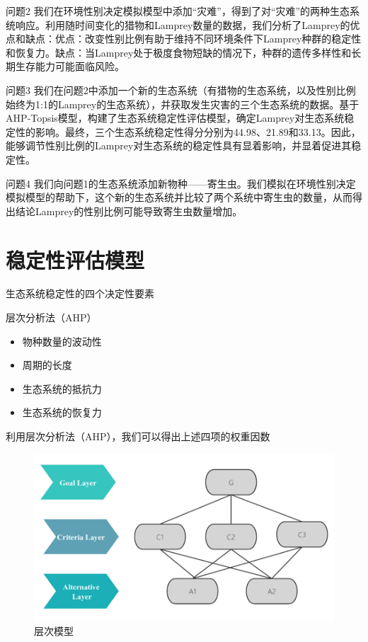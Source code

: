 \documentclass{beamer}
\begin{document}
\begin{frame}{问题2}
    \hspace{2em} 我们在环境性别决定模拟模型中添加“灾难”，得到了对“灾难”的两种生态系统响应。利用随时间变化的猎物和Lamprey数量的数据，我们分析了Lamprey的优点和缺点：优点：改变性别比例有助于维持不同环境条件下Lamprey种群的稳定性和恢复力。缺点：当Lamprey处于极度食物短缺的情况下，种群的遗传多样性和长期生存能力可能面临风险。
\end{frame}

\begin{frame}{问题3}
    \hspace{2em} 我们在问题2中添加一个新的生态系统（有猎物的生态系统，以及性别比例始终为1:1的Lamprey的生态系统），并获取发生灾害的三个生态系统的数据。基于AHP‑Topsis模型，构建了生态系统稳定性评估模型，确定Lamprey对生态系统稳定性的影响。最终，三个生态系统稳定性得分分别为44.98、21.89和33.13。因此，能够调节性别比例的Lamprey对生态系统的稳定性具有显着影响，并显着促进其稳定性。
\end{frame}

\begin{frame}{问题4}
    \hspace{2em} 我们向问题1的生态系统添加新物种——寄生虫。我们模拟在环境性别决定模拟模型的帮助下，这个新的生态系统并比较了两个系统中寄生虫的数量，从而得出结论Lamprey的性别比例可能导致寄生虫数量增加。
\end{frame}


\section{稳定性评估模型}

\begin{frame}{生态系统稳定性的四个决定性要素}
\begin{block}{层次分析法（AHP）}
    \begin{itemize}
        \item 物种数量的波动性
        \item 周期的长度
        \item 生态系统的抵抗力
        \item 生态系统的恢复力
    \end{itemize}
\end{block}

利用层次分析法（AHP），我们可以得出上述四项的权重因数
    \begin{figure}[htpb]
        \centering
        \includegraphics[width=0.6\linewidth]{./pic/Layout.png}
        \caption{层次模型}
    \end{figure}

\end{frame}
\end{document}

